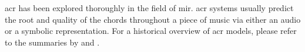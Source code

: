 

\gls{acr} has been explored thoroughly in the field of
\gls{mir}. \gls{acr} systems usually predict the root and
quality of the chords throughout a piece of music via either
an audio or a symbolic representation. For a historical
overview of \gls{acr} models, please refer to the summaries
by \textcite{pauwels201920} and \textcite{ju2021addressing}.
